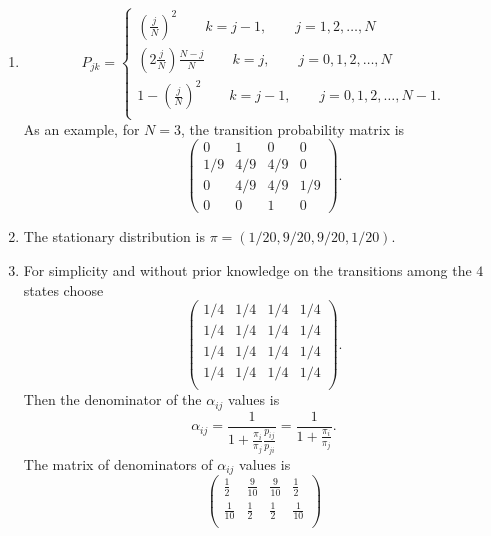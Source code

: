 \documentclass[12pt]{article}
\begin{document}
\begin{solution}
    \begin{enumerate}[label=(\alph*)]
    \item
        \[
            P_{jk} =
            \begin{cases}
                (\frac{j}{N})^2 \qquad k = j-1, \qquad j=1,2,\dots,N \\
                (2\frac{j}{N})\frac{N-j}{N} \qquad k = j, \qquad
                j=0,1,2,\dots,N \\
                1- (\frac{j}{N})^2 \qquad k = j-1, \qquad j=0,1,2,\dots,N-1.
                \\
            \end{cases}
        \] As an example, for \( N = 3 \), the transition probability
        matrix is
        \[
            \begin{pmatrix}
                0 & 1 & 0 & 0 \\
                1/9 & 4/9 & 4/9 & 0 \\
                0 & 4/9 & 4/9 & 1/9 \\
                0 & 0 & 1 & 0
            \end{pmatrix}
            .
        \]
    \item
        The stationary distribution is \( \pi = (1/20, 9/20, 9/20, 1/20)
        \).
    \item
        For simplicity and without prior knowledge on the transitions
        among the \( 4 \) states choose
        \[
            \begin{pmatrix}
                1/4 & 1/4 & 1/4 & 1/4 \\
                1/4 & 1/4 & 1/4 & 1/4 \\
                1/4 & 1/4 & 1/4 & 1/4 \\
                1/4 & 1/4 & 1/4 & 1/4 \\
            \end{pmatrix}
            .
        \] Then the denominator of the \( \alpha_{ij} \) values is
        \[
            \alpha_{ij} = \frac{1}{1 + \frac{\pi_i}{\pi_j} \frac{p_ {ij}}
            {p_{ji}}} = \frac{1}{1 + \frac{\pi_i}{\pi_j}}.
        \] The matrix of denominators of \( \alpha_{ij} \) values is
        \[
            \begin{pmatrix}
                \frac{1}{2} & \frac{9}{10} & \frac{9}{10} & \frac{1}{2}\\
                \frac{1}{10} & \frac{1}{2} & \frac{1}{2} & \frac{1}{10}\\

\end{pmatrix}\]
\end{enumerate}
\end{solution}
\end{document}
